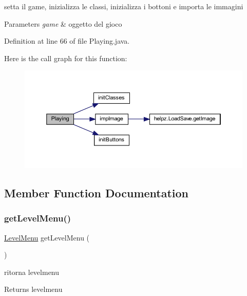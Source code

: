 setta il game, inizializza le classi, inizializza i bottoni e importa le immagini 


\begin{DoxyParams}{Parameters}
{\em game} & oggetto del gioco \\
\hline
\end{DoxyParams}


Definition at line 66 of file Playing.\+java.

Here is the call graph for this function\+:
\nopagebreak
\begin{figure}[H]
\begin{center}
\leavevmode
\includegraphics[width=350pt]{classscenes_1_1_playing_af94feaa0eefab45fb50a75c76679c2c7_cgraph}
\end{center}
\end{figure}


\subsection{Member Function Documentation}
\mbox{\label{classscenes_1_1_playing_a0ce048e98f125d557d6b5f68d8993bb5}} 
\subsubsection{\texorpdfstring{get\+Level\+Menu()}{getLevelMenu()}}
{\footnotesize\ttfamily \hyperlink{classui_1_1_level_menu}{Level\+Menu} get\+Level\+Menu (\begin{DoxyParamCaption}{ }\end{DoxyParamCaption})}



ritorna levelmenu 

\begin{DoxyReturn}{Returns}
levelmenu 
\end{DoxyReturn}


